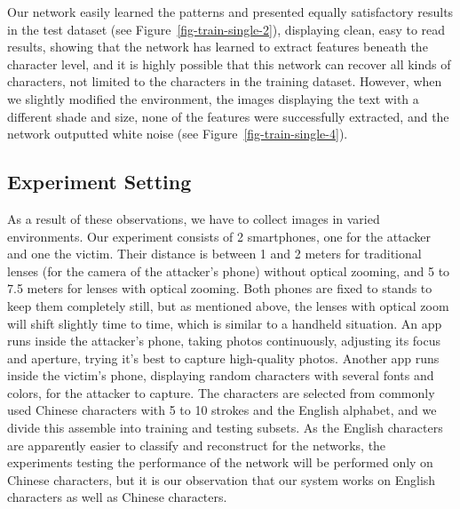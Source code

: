 Our network easily learned the patterns and presented equally satisfactory results in the test dataset (see Figure~\ref{fig-train-single-2}), displaying clean, easy to read results, showing that the network has learned to extract features beneath the character level, and it is highly possible that this network can recover all kinds of characters, not limited to the characters in the training dataset. However, when we slightly modified the environment, the images displaying the text with a different shade and size, none of the features were successfully extracted, and the network outputted white noise (see Figure~\ref{fig-train-single-4}).

\subsection{Experiment Setting}
As a result of these observations, we have to collect images in varied environments. Our experiment consists of 2 smartphones, one for the attacker and one the victim. Their distance is between 1 and 2 meters for traditional lenses (for the camera of the attacker's phone) without optical zooming, and 5 to 7.5 meters for lenses with optical zooming. Both phones are fixed to stands to keep them completely still, but as mentioned above, the lenses with optical zoom will shift slightly time to time, which is similar to a handheld situation. An app runs inside the attacker's phone, taking photos continuously, adjusting its focus and aperture, trying it's best to capture high-quality photos. Another app runs inside the victim's phone, displaying random characters with several fonts and colors, for the attacker to capture. The characters are selected from commonly used Chinese characters with 5 to 10 strokes and the English alphabet, and we divide this assemble into training and testing subsets. As the English characters are apparently easier to classify and reconstruct for the networks, the experiments testing the performance of the network will be performed only on Chinese characters, but it is our observation that our system works on English characters as well as Chinese characters.

